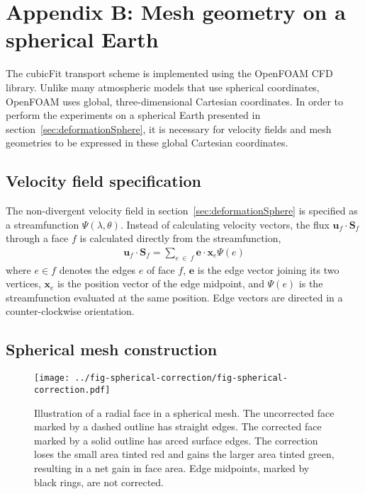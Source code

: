 \section*{Appendix B: Mesh geometry on a spherical Earth}

The cubicFit transport scheme is implemented using the OpenFOAM CFD library.  Unlike many atmospheric models that use spherical coordinates, OpenFOAM uses global, three-dimensional Cartesian coordinates.  In order to perform the experiments on a spherical Earth presented in section~\ref{sec:deformationSphere}, it is necessary for velocity fields and mesh geometries to be expressed in these global Cartesian coordinates.

\subsection*{Velocity field specification}
The non-divergent velocity field in section~\ref{sec:deformationSphere} is specified as a streamfunction $\Psi(\lambda, \theta)$.  Instead of calculating velocity vectors, the flux $\mathbf{u}_f \cdot \mathbf{S}_f$ through a face $f$ is calculated directly from the streamfunction,
\begin{align}
	\mathbf{u}_f \cdot \mathbf{S}_f	= \sum_{e\:\in\:f} \mathbf{e} \cdot \mathbf{x}_e \Psi(e) \label{eqn:nondiv-spherical-flux}
\end{align}
where $e \in f$ denotes the edges $e$ of face $f$, $\mathbf{e}$ is the edge vector joining its two vertices, $\mathbf{x}_e$ is the position vector of the edge midpoint, and $\Psi(e)$ is the streamfunction evaluated at the same position.
Edge vectors are directed in a counter-clockwise orientation.

\subsection*{Spherical mesh construction}

\begin{figure}
	\centering
	\texttt{[image: ../fig-spherical-correction/fig-spherical-correction.pdf]}
	\caption{Illustration of a radial face in a spherical mesh.  The uncorrected face marked by a dashed outline has straight edges.  The corrected face marked by a solid outline has arced surface edges.
	The correction loses the small area tinted red and gains the larger area tinted green, resulting in a net gain in face area.
	Edge midpoints, marked by black rings, are not corrected.}
	\label{fig:spherical-correction}
\end{figure}


